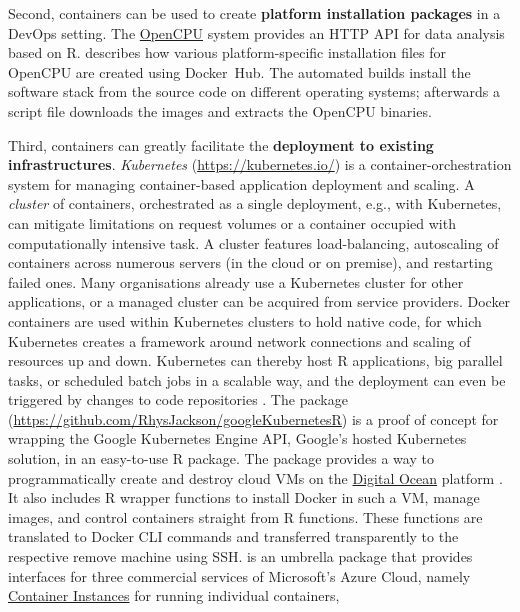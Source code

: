 Second, containers can be used to create \textbf{platform installation
packages} in a DevOps setting. The
\href{https://www.opencpu.org/}{OpenCPU} system provides an HTTP API for
data analysis based on R. \citet{ooms_opencpu_2017} describes how
various platform-specific installation files for OpenCPU are created
using Docker~Hub. The automated builds install the software stack from
the source code on different operating systems; afterwards a script file
downloads the images and extracts the OpenCPU binaries.

Third, containers can greatly facilitate the \textbf{deployment to
existing infrastructures}. \emph{Kubernetes}
(\url{https://kubernetes.io/}) is a container-orchestration system for
managing container-based application deployment and scaling. A
\emph{cluster} of containers, orchestrated as a single deployment, e.g.,
with Kubernetes, can mitigate limitations on request volumes or a
container occupied with computationally intensive task. A cluster
features load-balancing, autoscaling of containers across numerous
servers (in the cloud or on premise), and restarting failed ones. Many
organisations already use a Kubernetes cluster for other applications,
or a managed cluster can be acquired from service providers. Docker
containers are used within Kubernetes clusters to hold native code, for
which Kubernetes creates a framework around network connections and
scaling of resources up and down. Kubernetes can thereby host R
applications, big parallel tasks, or scheduled batch jobs in a scalable
way, and the deployment can even be triggered by changes to code
repositories \citep[i.e., CD, see][]{edmondson_r_2018}. The package
(\url{https://github.com/RhysJackson/googleKubernetesR}) is a proof of
concept for wrapping the Google Kubernetes Engine API, Google's hosted
Kubernetes solution, in an easy-to-use R package. The package
 provides a way to programmatically create and
destroy cloud VMs on the \href{https://www.digitalocean.com/}{Digital
Ocean} platform \citep{analogsea_2019}. It also includes R wrapper
functions to install Docker in such a VM, manage images, and control
containers straight from R functions. These functions are translated to
Docker CLI commands and transferred transparently to the respective
remove machine using SSH.  is an umbrella
package that provides interfaces for three commercial services of
Microsoft's Azure Cloud, namely
\href{https://azure.microsoft.com/en-us/services/container-instances/}{Container
Instances} for running individual containers,
